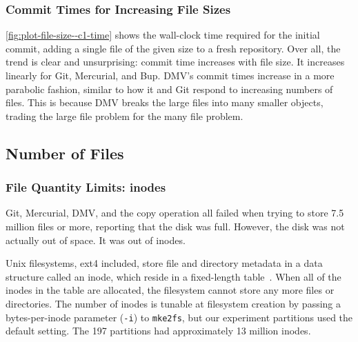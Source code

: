 %

\subsubsection{Commit Times for Increasing File Sizes}


\autoref{fig:plot-file-size--c1-time} shows the wall-clock time required for the initial \gls{commit}, adding a single file of the given size to a fresh \gls{repository}.
Over all, the trend is clear and unsurprising: \gls{commit} time increases with file size.
It increases linearly for Git, Mercurial, and Bup.
DMV's commit times increase in a more parabolic fashion,
similar to how it and Git respond to increasing numbers of files.
This is because DMV breaks the large files into many smaller objects, trading the large file problem for the many file problem.


%



\subsection{Number of Files}

\subsubsection{File Quantity Limits: inodes}


Git, Mercurial, DMV, and the copy operation all failed when trying to store \num{7.5} million files or more, reporting that the disk was full.
However, the disk was not actually out of space.
It was out of \glspl{inode}.

Unix filesystems, ext4 included, store file and directory metadata in a data structure called an \gls{inode}, which reside in a fixed-length table~\cite{unix_timesharing_system}.
When all of the \glspl{inode} in the table are allocated, the filesystem cannot store any more files or directories.
The number of inodes is tunable at filesystem creation by passing a bytes-per-inode parameter (\lstinline{-i}) to \lstinline{mke2fs}, but our experiment partitions used the default setting.
The \SI{197}{\gib} partitions had approximately \num{13} million inodes.

